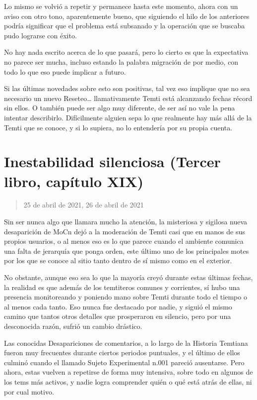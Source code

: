 \documentclass[
  spanish,
]{book}
\begin{document}
Lo mismo se volvió a repetir y permanece hasta este momento, ahora con un aviso con otro tono, aparentemente bueno, que siguiendo el hilo de los anteriores podría significar que el problema está subsanado y la operación que se buscaba pudo lograrse con éxito.

No hay nada escrito acerca de lo que pasará, pero lo cierto es que la expectativa no parece ser mucha, incluso estando la palabra migración de por medio, con todo lo que eso puede implicar a futuro.

Si las últimas novedades sobre esto son positivas, tal vez eso implique que no sea necesario un nuevo Reseteo\ldots{} llamativamente Temti está alcanzando fechas récord sin ellos. O también puede ser algo muy diferente, de ser así no vale la pena intentar describirlo. Difícilmente alguien sepa lo que realmente hay más allá de la Temti que se conoce, y si lo supiera, no lo entendería por su propia cuenta.

\hypertarget{inestabilidad-silenciosa-tercer-libro-capuxedtulo-xix}{%
\section{Inestabilidad silenciosa (Tercer libro, capítulo XIX)}\label{inestabilidad-silenciosa-tercer-libro-capuxedtulo-xix}}

\begin{quote}
25 de abril de 2021, 26 de abril de 2021
\end{quote}

Sin ser nunca algo que llamara mucho la atención, la misteriosa y sigilosa nueva desaparición de MoCn dejó a la moderación de Temti casi que en manos de sus propios usuarios, o al menos eso es lo que parece cuando el ambiente comunica una falta de jerarquía que ponga orden, este último uno de los principales motes por los que se conoce al sitio tanto dentro de sí mismo como en el exterior.

No obstante, aunque eso sea lo que la mayoría creyó durante estas últimas fechas, la realidad es que además de los temtiteros comunes y corrientes, sí hubo una presencia monitoreando y poniendo mano sobre Temti durante todo el tiempo o al menos cada tanto. Eso nunca fue destacado por nadie, y siguió el mismo camino que tantos otros detalles que prosperaron en silencio, pero por una desconocida razón, sufrió un cambio drástico.

Las conocidas Desapariciones de comentarios, a lo largo de la Historia Temtiana fueron muy frecuentes durante ciertos periodos puntuales, y el último de ellos culminó cuando el llamado Sujeto Experimental n.001 pareció ausentarse. Pero ahora, estas vuelven a repetirse de forma muy intensiva, sobre todo en algunos de los tems más activos, y nadie logra comprender quién o qué está atrás de ellas, ni por cual motivo.
\end{document}
